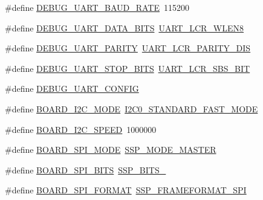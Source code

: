 \begin{DoxyCompactItemize}
\#define \hyperlink{group__hal_gadf735c02ae01a655dbbfc89683107df1}{D\+E\+B\+U\+G\+\_\+\+U\+A\+R\+T\+\_\+\+B\+A\+U\+D\+\_\+\+R\+A\+TE}~115200
\item 
\#define \hyperlink{group__hal_ga5461cba1b266ac88e586ceb025c2a993}{D\+E\+B\+U\+G\+\_\+\+U\+A\+R\+T\+\_\+\+D\+A\+T\+A\+\_\+\+B\+I\+TS}~\hyperlink{group___u_a_r_t__18_x_x__43_x_x_ga71ecde192fb0c9facb9ef9c6b77cc687}{U\+A\+R\+T\+\_\+\+L\+C\+R\+\_\+\+W\+L\+E\+N8}
\item 
\#define \hyperlink{group__hal_gaec7cd5ed121d05a86fd013b6456ed725}{D\+E\+B\+U\+G\+\_\+\+U\+A\+R\+T\+\_\+\+P\+A\+R\+I\+TY}~\hyperlink{group___u_a_r_t__18_x_x__43_x_x_ga91bc2978f5af5ac9a1f18af284275b39}{U\+A\+R\+T\+\_\+\+L\+C\+R\+\_\+\+P\+A\+R\+I\+T\+Y\+\_\+\+D\+IS}
\item 
\#define \hyperlink{group__hal_gacc0b498b69723d16453ec5321d766427}{D\+E\+B\+U\+G\+\_\+\+U\+A\+R\+T\+\_\+\+S\+T\+O\+P\+\_\+\+B\+I\+TS}~\hyperlink{group___u_a_r_t__18_x_x__43_x_x_ga70ccdedb76a079b8e7c87e5c3709469c}{U\+A\+R\+T\+\_\+\+L\+C\+R\+\_\+\+S\+B\+S\+\_\+B\+IT}
\item 
\#define \hyperlink{group__hal_ga31d6224b0a81c9e6a428fc2ce1072082}{D\+E\+B\+U\+G\+\_\+\+U\+A\+R\+T\+\_\+\+C\+O\+N\+F\+IG}
\item 
\#define \hyperlink{group__hal_ga0e300886a975da5cb65db5b241eb239b}{B\+O\+A\+R\+D\+\_\+\+I2\+C\+\_\+\+M\+O\+DE}~\hyperlink{group___s_c_u__18_x_x__43_x_x_ga3d2136c7b5dd51b79986b151192bba55}{I2\+C0\+\_\+\+S\+T\+A\+N\+D\+A\+R\+D\+\_\+\+F\+A\+S\+T\+\_\+\+M\+O\+DE}
\item 
\#define \hyperlink{group__hal_ga0183689a44409edabe8c145ee78ed335}{B\+O\+A\+R\+D\+\_\+\+I2\+C\+\_\+\+S\+P\+E\+ED}~1000000
\item 
\#define \hyperlink{group__hal_ga1bbd961c030ce3a56149348fbe1d13e4}{B\+O\+A\+R\+D\+\_\+\+S\+P\+I\+\_\+\+M\+O\+DE}~\hyperlink{group___s_s_p__18_x_x__43_x_x_gga2a375ed10848e3661b9b015fea1cf39ba5395d2342a5a2564d683efe73700d604}{S\+S\+P\+\_\+\+M\+O\+D\+E\+\_\+\+M\+A\+S\+T\+ER}
\item 
\#define \hyperlink{group__hal_gae88cc90089d786fbd464bdb7044d55ff}{B\+O\+A\+R\+D\+\_\+\+S\+P\+I\+\_\+\+B\+I\+TS}~\hyperlink{group___s_s_p__18_x_x__43_x_x_gga2f99e08511788c146ae9b35023e4a61cafed74a949c86fb130814553eeeaa28fc}{S\+S\+P\+\_\+\+B\+I\+T\+S\+\_}
\item 
\#define \hyperlink{group__hal_ga3d0601e312d64996d8cab493be3c0250}{B\+O\+A\+R\+D\+\_\+\+S\+P\+I\+\_\+\+F\+O\+R\+M\+AT}~\hyperlink{group___s_s_p__18_x_x__43_x_x_ggad3ae555ad43caa2b2a47bc4769d8fe50a04830722a3c3c26165b6e86944f80799}{S\+S\+P\+\_\+\+F\+R\+A\+M\+E\+F\+O\+R\+M\+A\+T\+\_\+\+S\+PI}

\end{DoxyCompactItemize}
